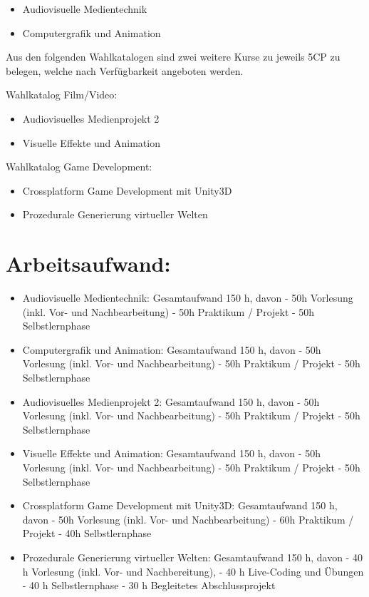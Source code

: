\begin{itemize}
\item
  Audiovisuelle Medientechnik
\item
  Computergrafik und Animation
\end{itemize}

Aus den folgenden Wahlkatalogen sind zwei weitere Kurse zu jeweils 5CP
zu belegen, welche nach Verfügbarkeit angeboten werden.

Wahlkatalog Film/Video:

\begin{itemize}
\item
  Audiovisuelles Medienprojekt 2
\item
  Visuelle Effekte und Animation
\end{itemize}

Wahlkatalog Game Development:

\begin{itemize}
\item
  Crossplatform Game Development mit Unity3D
\item
  Prozedurale Generierung virtueller Welten
\end{itemize}

\section*{Arbeitsaufwand:}\label{arbeitsaufwand-21}

\begin{itemize}
\item
  Audiovisuelle Medientechnik: Gesamtaufwand 150 h, davon - 50h
  Vorlesung (inkl. Vor- und Nachbearbeitung) - 50h Praktikum / Projekt -
  50h Selbstlernphase
\item
  Computergrafik und Animation: Gesamtaufwand 150 h, davon - 50h
  Vorlesung (inkl. Vor- und Nachbearbeitung) - 50h Praktikum / Projekt -
  50h Selbstlernphase
\item
  Audiovisuelles Medienprojekt 2: Gesamtaufwand 150 h, davon - 50h
  Vorlesung (inkl. Vor- und Nachbearbeitung) - 50h Praktikum / Projekt -
  50h Selbstlernphase
\item
  Visuelle Effekte und Animation: Gesamtaufwand 150 h, davon - 50h
  Vorlesung (inkl. Vor- und Nachbearbeitung) - 50h Praktikum / Projekt -
  50h Selbstlernphase
\item
  Crossplatform Game Development mit Unity3D: Gesamtaufwand 150 h, davon
  - 50h Vorlesung (inkl. Vor- und Nachbearbeitung) - 60h Praktikum /
  Projekt - 40h Selbstlernphase
\item
  Prozedurale Generierung virtueller Welten: Gesamtaufwand 150 h, davon
  - 40 h Vorlesung (inkl. Vor- und Nachbereitung), - 40 h Live-Coding
  und Übungen - 40 h Selbstlernphase - 30 h Begleitetes Abschlussprojekt
\end{itemize}

